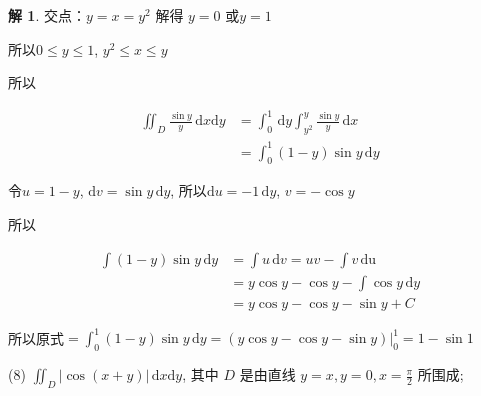 \documentclass[a4paper,12pt]{article}
\theoremstyle{definition}
\newtheorem*{sol}{解}
\begin{document}
\begin{sol}
    交点：$y=x=y^2$ 解得 $y=0$ 或$y=1$

    所以$0\leq y\leq 1$, $y^2\leq x\leq y$

    所以

    \begin{align*}
        \iint_{D} \frac{\sin y}{y}\,\mathrm{d}x\mathrm{d}y
         & =\int_0^1\,\mathrm{d}y\int_{y^2}^y\frac{\sin y}{y}\,\mathrm{d}x \\
         & =\int_0^1 (1-y)\sin y\,\mathrm{d}y
    \end{align*}

    令$u=1-y$, $\mathrm{d}v=\sin y\,\mathrm{d}y$, 所以$\mathrm{d}u=-1\,\mathrm{d}y$, $v=-\cos y$

    所以

    \begin{align*}
        \int (1-y)\sin y\,\mathrm{d}y
         & =\int u\,\mathrm{d}v=uv-\int v\,\mathrm{du} \\
         & =y\cos y-\cos y-\int\cos y\,\mathrm{d}y     \\
         & =y\cos y-\cos y-\sin y+C
    \end{align*}

    所以原式$=\int_0^1 (1-y)\sin y\,\mathrm{d}y=\left.(y\cos y-\cos y-\sin y)\right|_0^1=1-\sin1$
\end{sol}
(8) $\displaystyle \iint_{D} \left|\cos(x+y)\right|\,\mathrm{d}x\mathrm{d}y$, 其中 $D$ 是由直线 $\displaystyle y=x,y=0,x=\frac{\pi}{2}$ 所围成;
\end{document}
